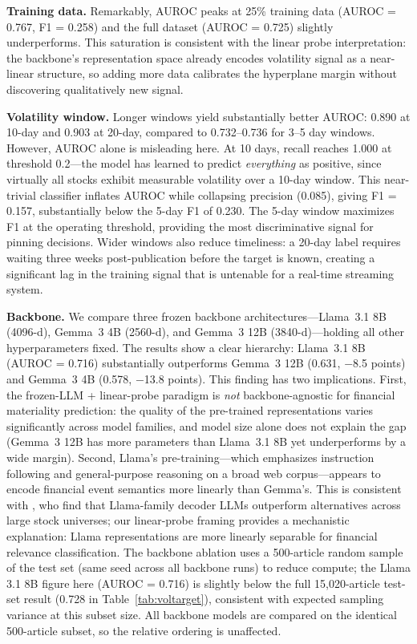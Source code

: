 \documentclass{article}
\begin{document}
\textbf{Training data.}
Remarkably, AUROC peaks at 25\% training data (AUROC = 0.767, F1 = 0.258) and the full dataset (AUROC = 0.725) slightly underperforms.
This saturation is consistent with the linear probe interpretation: the backbone's representation space already encodes volatility signal as a near-linear structure, so adding more data calibrates the hyperplane margin without discovering qualitatively new signal.

\textbf{Volatility window.}
Longer windows yield substantially better AUROC: 0.890 at 10-day and 0.903 at 20-day, compared to 0.732--0.736 for 3--5 day windows.
However, AUROC alone is misleading here.
At 10 days, recall reaches 1.000 at threshold 0.2---the model has learned to predict \emph{everything} as positive, since virtually all stocks exhibit measurable volatility over a 10-day window.
This near-trivial classifier inflates AUROC while collapsing precision (0.085), giving F1 = 0.157, substantially below the 5-day F1 of 0.230.
The 5-day window maximizes F1 at the operating threshold, providing the most discriminative signal for pinning decisions.
Wider windows also reduce timeliness: a 20-day label requires waiting three weeks post-publication before the target is known, creating a significant lag in the training signal that is untenable for a real-time streaming system.

\textbf{Backbone.}
We compare three frozen backbone architectures---Llama~3.1 8B (4096-d), Gemma~3 4B (2560-d), and Gemma~3 12B (3840-d)---holding all other hyperparameters fixed.
The results show a clear hierarchy: Llama~3.1 8B (AUROC = 0.716) substantially outperforms Gemma~3 12B (0.631, $-$8.5 points) and Gemma~3 4B (0.578, $-$13.8 points).
This finding has two implications.
First, the frozen-LLM + linear-probe paradigm is \emph{not} backbone-agnostic for financial materiality prediction: the quality of the pre-trained representations varies significantly across model families, and model size alone does not explain the gap (Gemma~3 12B has more parameters than Llama~3.1 8B yet underperforms by a wide margin).
Second, Llama's pre-training---which emphasizes instruction following and general-purpose reasoning on a broad web corpus---appears to encode financial event semantics more linearly than Gemma's.
This is consistent with \citet{guo2024finetuning}, who find that Llama-family decoder LLMs outperform alternatives across large stock universes; our linear-probe framing provides a mechanistic explanation: Llama representations are more linearly separable for financial relevance classification.
The backbone ablation uses a 500-article random sample of the test set (same seed across all backbone runs) to reduce compute; the Llama 3.1 8B figure here (AUROC = 0.716) is slightly below the full 15,020-article test-set result (0.728 in Table~\ref{tab:voltarget}), consistent with expected sampling variance at this subset size. All backbone models are compared on the identical 500-article subset, so the relative ordering is unaffected.
\end{document}

